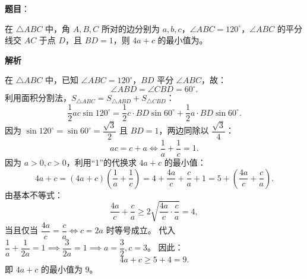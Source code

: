 \begin{answer}

\textbf{题目}：

在 $\triangle ABC$ 中，角 $A, B, C$ 所对的边分别为 $a, b, c$，$\angle ABC = 120^\circ$，$\angle ABC$ 的平分线交 $AC$ 于点 $D$，且 $BD = 1$，则 $4a + c$ 的最小值为\gkblank{}。

\textbf{解析}

在 $\triangle ABC$ 中，已知 $\angle ABC = 120^\circ$，$BD$ 平分 $\angle ABC$，故：
\nopagebreak[4]
\[\angle ABD = \angle CBD = 60^\circ.\]
利用面积分割法，$S_{\triangle ABC} = S_{\triangle ABD} + S_{\triangle CBD}$：
\nopagebreak[4]
\[\frac{1}{2} ac \sin 120^\circ = \frac{1}{2} c \cdot BD \sin 60^\circ + \frac{1}{2} a \cdot BD \sin 60^\circ.\]
因为 $\sin 120^\circ = \sin 60^\circ = \dfrac{\sqrt{3}}{2}$ 且 $BD = 1$，两边同除以 $\dfrac{\sqrt{3}}{4}$：
\nopagebreak[4]
\[ac = c + a \iff \frac{1}{a} + \frac{1}{c} = 1.\]
因为 $a > 0, c > 0$，利用“1”的代换求 $4a + c$ 的最小值：
\nopagebreak[4]
\[4a + c = (4a + c)\left(\frac{1}{a} + \frac{1}{c}\right) = 4 + \frac{4a}{c} + \frac{c}{a} + 1 = 5 + \left(\frac{4a}{c} + \frac{c}{a}\right).\]
由基本不等式：
\nopagebreak[4]
\[\frac{4a}{c} + \frac{c}{a} \geqslant 2\sqrt{\frac{4a}{c} \cdot \frac{c}{a}} = 4,\]
当且仅当 $\dfrac{4a}{c} = \dfrac{c}{a} \iff c = 2a$ 时等号成立。
代入 $\dfrac{1}{a} + \dfrac{1}{2a} = 1 \implies \dfrac{3}{2a} = 1 \implies a = \dfrac{3}{2}, c = 3$。
因此：
\nopagebreak[4]
\[4a + c \geqslant 5 + 4 = 9.\]
即 $4a + c$ 的最小值为 $9$。


\end{answer}
